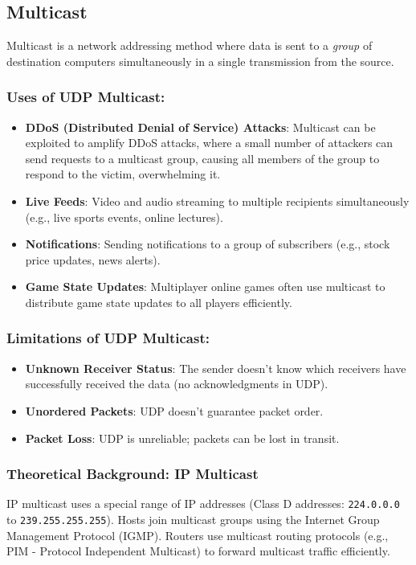 \subsection{Multicast}
Multicast is a network addressing method where data is sent to a \textit{group} of destination computers simultaneously in a single transmission from the source.

\subsubsection{Uses of UDP Multicast:}

\begin{itemize}
    \item \textbf{DDoS (Distributed Denial of Service) Attacks}: Multicast can be exploited to amplify DDoS attacks, where a small number of attackers can send requests to a multicast group, causing all members of the group to respond to the victim, overwhelming it.
    \item \textbf{Live Feeds}:  Video and audio streaming to multiple recipients simultaneously (e.g., live sports events, online lectures).
    \item \textbf{Notifications}:  Sending notifications to a group of subscribers (e.g., stock price updates, news alerts).
    \item \textbf{Game State Updates}:  Multiplayer online games often use multicast to distribute game state updates to all players efficiently.
\end{itemize}

\subsubsection{Limitations of UDP Multicast:}

\begin{itemize}
    \item \textbf{Unknown Receiver Status}:  The sender doesn't know which receivers have successfully received the data (no acknowledgments in UDP).
    \item \textbf{Unordered Packets}:  UDP doesn't guarantee packet order.
    \item \textbf{Packet Loss}:  UDP is unreliable; packets can be lost in transit.
\end{itemize}

\subsubsection{Theoretical Background: IP Multicast}
IP multicast uses a special range of IP addresses (Class D addresses: \texttt{224.0.0.0} to \texttt{239.255.255.255}). Hosts join multicast groups using the Internet Group Management Protocol (IGMP). Routers use multicast routing protocols (e.g., PIM - Protocol Independent Multicast) to forward multicast traffic efficiently.


